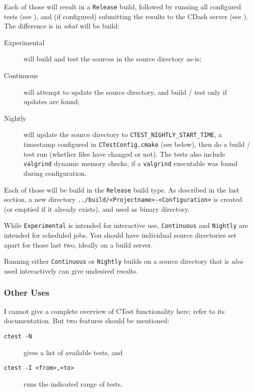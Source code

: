 Each of those will result in a \lstinline{Release} build, followed by running all configured tests (see ), and (if configured) submitting the results to the CDash server (see ). The difference is in \emph{what} will be build:

\begin{description}
\item[Experimental] will build and test the sources in the source directory as-is;
\item[Continuous] will attempt to update the source directory, and build / test only if updates are found;
\item[Nightly] will update the source directory to \lstinline{CTEST_NIGHTLY_START_TIME}, a timestamp configured in \lstinline{CTestConfig.cmake} (see below), then do a build / test run (whether files have changed or not). The tests also include \lstinline{valgrind} dynamic memory checks, if a \lstinline{valgrind} executable was found during configuration.
\end{description}

Each of those will be build in the \lstinline{Release} build type. As described in the last section, a new directory \lstinline{../build/<Projectname>-<Configuration>} is created (or emptied if it already exists), and used as binary directory.

While \lstinline{Experimental} is intended for interactive use, \lstinline{Continuous} and \lstinline{Nightly} are intended for scheduled jobs. You should have individual source directories set apart for those last two, ideally on a build server.

Running either \lstinline{Continuous} or \lstinline{Nightly} builds on a source directory that is \emph{also} used interactively can give undesired results.

\subsubsection{Other Uses}

I cannot give a complete overview of CTest functionality here; refer to its documentation. But two features should be mentioned:

\begin{description}
\item[\texttt{ctest -N}] gives a list of available tests, and
\item[\texttt{ctest -I <from>,<to>}] runs the indicated range of tests.
\end{description}

